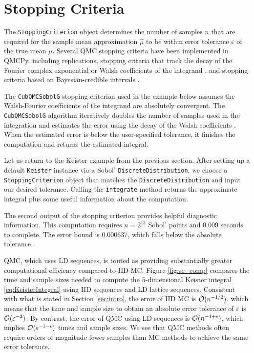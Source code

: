 \documentclass[graybox,footinfo]{svmult}
\newcommand{\hmu}{\widehat{\mu}}
\begin{document}
\section{Stopping Criteria} \label{sec:stopping_crit}

The \texttt{StoppingCriterion} object determines the number of samples $n$ that are required for the sample mean approximation $\hmu$ to be within error tolerance $\varepsilon$ of the true mean $\mu$.  Several QMC stopping criteria have been implemented in QMCPy, including replications, stopping criteria that track the decay of the Fourier complex exponential or Walsh coefficients of the integrand \cite{HicJim16a,HicEtal17a,JimHic16a}, and stopping criteria based on
Bayesian-credible intervals \cite{RatHic19a,JagHic22a}.

The \texttt{CubQMCSobolG} stopping criterion used in the example below assumes the Walsh-Fourier coefficients of the integrand are absolutely convergent. The \texttt{CubQMCSobolG} algorithm iteratively doubles the number of samples used in the integration and estimates the error using the decay of the Walsh coefficients \cite{HicJim16a}. When the estimated error is below the user-specified tolerance, it finishes the computation and returns the estimated integral.

Let us return to the Keister example from the previous section.  After setting up  a default \texttt{Keister} instance via a Sobol' \texttt{DiscreteDistribution}, we choose a \texttt{StoppingCriterion} object that matches the \texttt{DiscreteDistribution} and input our desired tolerance.  Calling the  \texttt{integrate} method returns the approximate integral plus some useful information about the computation.

The second output of the stopping criterion provides helpful diagnostic information.  This computation requires $n=2^{13}$ Sobol' points and $0.009$ seconds to complete.  The error bound is $0.000637$, which falls below the absolute tolerance.

QMC, which uses LD sequences, is touted as providing substantially greater computational efficiency compared to IID MC.
Figure \ref{fig:sc_comp} compares the time and sample sizes needed to compute the $5$-dimensional Keister integral \eqref{eq:KeisterIntegral} using IID sequences and LD lattice sequences. Consistent with what is stated in Section \ref{sec:intro}, the error of IID MC is ${\mathcal{O}}(n^{-1/2})$, which means that the time and sample size to obtain an absolute error tolerance of $\varepsilon$ is ${\mathcal{O}}(\varepsilon^{-2})$.  By contrast, the  error of QMC using LD sequences is ${\mathcal{O}}(n^{-1+\epsilon})$, which implies ${\mathcal{O}}(\varepsilon^{-1-\epsilon})$ times and sample sizes.  We see that QMC methods often require orders of magnitude fewer samples than MC methods to achieve the same error tolerance.
\end{document}
